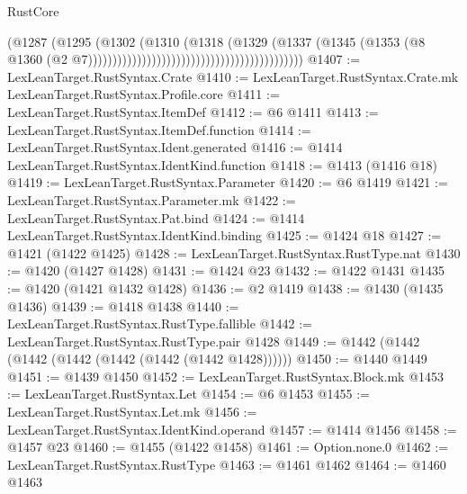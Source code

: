 \begin{lexlean}{RustCore}
\begin{coremodule}
                                                                      (@1287
                                                                        (@1295
                                                                          (@1302
                                                                            (@1310
                                                                              (@1318
                                                                                (@1329
                                                                                  (@1337
                                                                                    (@1345
                                                                                      (@1353
                                                                                        (@8
                                                                                          @1360
                                                                                          (@2
                                                                                            @7))))))))))))))))))))))))))))))))))))))))))))
@1407 := LexLeanTarget.RustSyntax.Crate
@1410 := LexLeanTarget.RustSyntax.Crate.mk LexLeanTarget.RustSyntax.Profile.core
@1411 := LexLeanTarget.RustSyntax.ItemDef
@1412 := @6 @1411
@1413 := LexLeanTarget.RustSyntax.ItemDef.function
@1414 := LexLeanTarget.RustSyntax.Ident.generated
@1416 := @1414 LexLeanTarget.RustSyntax.IdentKind.function
@1418 := @1413 (@1416 @18)
@1419 := LexLeanTarget.RustSyntax.Parameter
@1420 := @6 @1419
@1421 := LexLeanTarget.RustSyntax.Parameter.mk
@1422 := LexLeanTarget.RustSyntax.Pat.bind
@1424 := @1414 LexLeanTarget.RustSyntax.IdentKind.binding
@1425 := @1424 @18
@1427 := @1421 (@1422 @1425)
@1428 := LexLeanTarget.RustSyntax.RustType.nat
@1430 := @1420 (@1427 @1428)
@1431 := @1424 @23
@1432 := @1422 @1431
@1435 := @1420 (@1421 @1432 @1428)
@1436 := @2 @1419
@1438 := @1430 (@1435 @1436)
@1439 := @1418 @1438
@1440 := LexLeanTarget.RustSyntax.RustType.fallible
@1442 := LexLeanTarget.RustSyntax.RustType.pair @1428
@1449 := @1442 (@1442 (@1442 (@1442 (@1442 (@1442 (@1442 @1428))))))
@1450 := @1440 @1449
@1451 := @1439 @1450
@1452 := LexLeanTarget.RustSyntax.Block.mk
@1453 := LexLeanTarget.RustSyntax.Let
@1454 := @6 @1453
@1455 := LexLeanTarget.RustSyntax.Let.mk
@1456 := LexLeanTarget.RustSyntax.IdentKind.operand
@1457 := @1414 @1456
@1458 := @1457 @23
@1460 := @1455 (@1422 @1458)
@1461 := Option.none.{0}
@1462 := LexLeanTarget.RustSyntax.RustType
@1463 := @1461 @1462
@1464 := @1460 @1463

\end{coremodule}
\end{lexlean}
